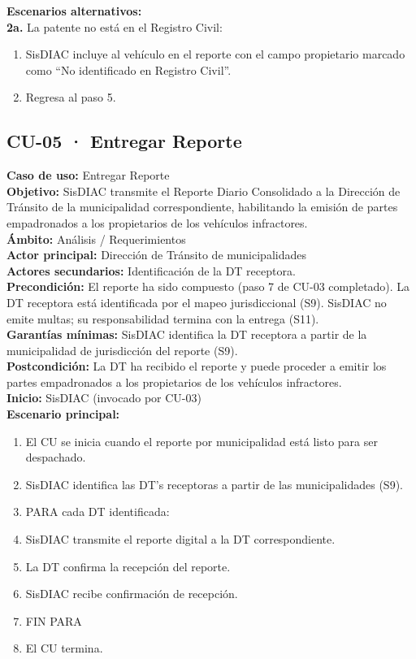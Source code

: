 \documentclass[12pt,letterpaper]{article}
\begin{document}
\noindent \textbf{Escenarios alternativos:} \\
\textbf{2a.} La patente no está en el Registro Civil:
\begin{enumerate}[nosep]
	\item[2a1.] SisDIAC incluye al vehículo en el reporte con el campo propietario marcado como ``No identificado en Registro Civil''.
	\item[2a2.] Regresa al paso 5.
\end{enumerate}

\newpage
\subsection{CU-05 · Entregar Reporte}

\noindent \textbf{Caso de uso:} Entregar Reporte \\
\textbf{Objetivo:} SisDIAC transmite el Reporte Diario Consolidado a la Dirección de Tránsito de la municipalidad correspondiente, habilitando la emisión de partes empadronados a los propietarios de los vehículos infractores. \\
\textbf{Ámbito:} Análisis / Requerimientos \\
\textbf{Actor principal:} Dirección de Tránsito de municipalidades \\
\textbf{Actores secundarios:} Identificación de la DT receptora. \\
\textbf{Precondición:} El reporte ha sido compuesto (paso 7 de CU-03 completado). La DT receptora está identificada por el mapeo jurisdiccional (S9). SisDIAC no emite multas; su responsabilidad termina con la entrega (S11). \\
\textbf{Garantías mínimas:} SisDIAC identifica la DT receptora a partir de la municipalidad de jurisdicción del reporte (S9). \\
\textbf{Postcondición:} La DT ha recibido el reporte y puede proceder a emitir los partes empadronados a los propietarios de los vehículos infractores. \\
\textbf{Inicio:} SisDIAC (invocado por CU-03) \\

\noindent \textbf{Escenario principal:}
\begin{enumerate}[nosep, leftmargin=*]
	\item El CU se inicia cuando el reporte por municipalidad está listo para ser despachado.
	\item SisDIAC identifica las DT's receptoras a partir de las municipalidades (S9).
	\item[] PARA cada DT identificada:
	\item SisDIAC transmite el reporte digital a la DT correspondiente.
	\item La DT confirma la recepción del reporte.
	\item SisDIAC recibe confirmación de recepción.
	\item [] FIN PARA
	\item El CU termina.
\end{enumerate}
\end{document}
